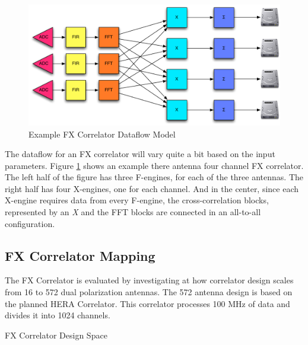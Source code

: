 \begin{figure}[h!]
  \centering
    \includegraphics[width=1\textwidth]{Images/C4/fx_dataflow.pdf}
  \caption{Example FX Correlator Dataflow Model}
  \label{fig: C6/fx_dataflow.pdf}
\end{figure}

The dataflow for an FX correlator will vary quite a bit based on the input parameters. 
Figure \ref{fig: C6/fx_dataflow.pdf} shows an example there antenna four channel FX correlator. 
The left half of the figure has three F-engines, for each of the three antennas.
The right half has four X-engines, one for each channel.
And in the center, since each X-engine requires data from every F-engine, the cross-correlation blocks, represented by an \emph{X} and the FFT blocks are connected in an all-to-all configuration.

\subsection{FX Correlator Mapping}
The FX Correlator is evaluated by investigating at how correlator design scales from 16 to 572 dual polarization antennas.
The 572 antenna design is based on the planned HERA Correlator.
This correlator processes 100 MHz of data and divides it into 1024 channels.

\begin{table}

\caption{FX Correlator Design Space}
\label{tab: C6/FX Correlator Design Space}
\end{table} 

